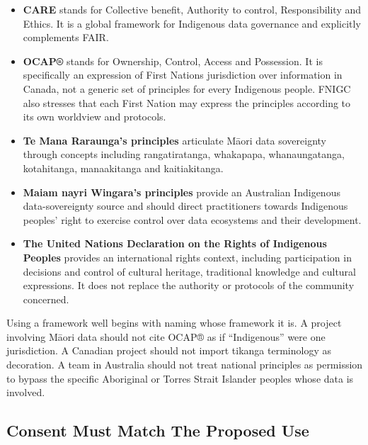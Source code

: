 \begin{itemize}[leftmargin=*]
\item \textbf{CARE} stands for Collective benefit, Authority to control, Responsibility and Ethics. It is a global framework for Indigenous data governance and explicitly complements FAIR. \autocite{care}
\item \textbf{OCAP®} stands for Ownership, Control, Access and Possession. It is specifically an expression of First Nations jurisdiction over information in Canada, not a generic set of principles for every Indigenous people. FNIGC also stresses that each First Nation may express the principles according to its own worldview and protocols. \autocite{ocap}
\item \textbf{Te Mana Raraunga's principles} articulate Māori data sovereignty through concepts including rangatiratanga, whakapapa, whanaungatanga, kotahitanga, manaakitanga and kaitiakitanga. \autocite{te-mana-raraunga}
\item \textbf{Maiam nayri Wingara's principles} provide an Australian Indigenous data-sovereignty source and should direct practitioners towards Indigenous peoples' right to exercise control over data ecosystems and their development. \autocite{mnw-principles}
\item \textbf{The United Nations Declaration on the Rights of Indigenous Peoples} provides an international rights context, including participation in decisions and control of cultural heritage, traditional knowledge and cultural expressions. It does not replace the authority or protocols of the community concerned. \autocite{undrip}
\end{itemize}

Using a framework well begins with naming whose framework it is. A project involving Māori data should not cite OCAP® as if ``Indigenous'' were one jurisdiction. A Canadian project should not import tikanga terminology as decoration. A team in Australia should not treat national principles as permission to bypass the specific Aboriginal or Torres Strait Islander peoples whose data is involved.



\subsection{Consent Must Match The Proposed Use}


